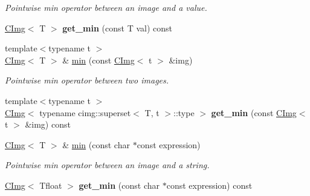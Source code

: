 \begin{DoxyCompactItemize}
\begin{DoxyCompactList}\small\item\em Pointwise min operator between an image and a value. \item\end{DoxyCompactList}\item 
\hypertarget{structcimg__library_1_1CImg_a73bba3d7f4cce95bdfe3988a53951444}{
\hyperlink{structcimg__library_1_1CImg}{CImg}$<$ T $>$ {\bfseries get\_\-min} (const T val) const }
\label{structcimg__library_1_1CImg_a73bba3d7f4cce95bdfe3988a53951444}

\item 
\hypertarget{structcimg__library_1_1CImg_a54fa8ab955fc28675dd0d0f4fbb9b7ad}{
{\footnotesize template$<$typename t $>$ }\\\hyperlink{structcimg__library_1_1CImg}{CImg}$<$ T $>$ \& \hyperlink{structcimg__library_1_1CImg_a54fa8ab955fc28675dd0d0f4fbb9b7ad}{min} (const \hyperlink{structcimg__library_1_1CImg}{CImg}$<$ t $>$ \&img)}
\label{structcimg__library_1_1CImg_a54fa8ab955fc28675dd0d0f4fbb9b7ad}

\begin{DoxyCompactList}\small\item\em Pointwise min operator between two images. \item\end{DoxyCompactList}\item 
\hypertarget{structcimg__library_1_1CImg_a34aa491841db08164ed7a99f199b8acc}{
{\footnotesize template$<$typename t $>$ }\\\hyperlink{structcimg__library_1_1CImg}{CImg}$<$ typename cimg::superset$<$ T, t $>$::type $>$ {\bfseries get\_\-min} (const \hyperlink{structcimg__library_1_1CImg}{CImg}$<$ t $>$ \&img) const }
\label{structcimg__library_1_1CImg_a34aa491841db08164ed7a99f199b8acc}

\item 
\hypertarget{structcimg__library_1_1CImg_a028aff9b60740772beea70c85285e216}{
\hyperlink{structcimg__library_1_1CImg}{CImg}$<$ T $>$ \& \hyperlink{structcimg__library_1_1CImg_a028aff9b60740772beea70c85285e216}{min} (const char $\ast$const expression)}
\label{structcimg__library_1_1CImg_a028aff9b60740772beea70c85285e216}

\begin{DoxyCompactList}\small\item\em Pointwise min operator between an image and a string. \item\end{DoxyCompactList}\item 
\hypertarget{structcimg__library_1_1CImg_a894849adc5771da8ef0dde7b575d8ab2}{
\hyperlink{structcimg__library_1_1CImg}{CImg}$<$ Tfloat $>$ {\bfseries get\_\-min} (const char $\ast$const expression) const }
\label{structcimg__library_1_1CImg_a894849adc5771da8ef0dde7b575d8ab2}


\end{DoxyCompactItemize}
